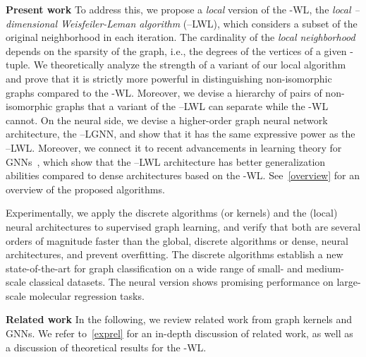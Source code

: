 \documentclass{article}
\newcommand{\xhdr}[1]{{\noindent\bfseries #1}}
\theoremstyle{definition}
\newcommand{\new}[1]{\emph{#1}}
\newcommand{\kwl}{-\textsf{WL}\xspace}
\newcommand{\localkwl}{--\textsf{LWL}\xspace}
\newcommand{\localkwln}{--\textsf{LGNN}\xspace}
\begin{document}
\xhdr{Present work} To address this, we propose a \new{local} version of the \kwl, the \new{local --dimensional Weisfeiler-Leman algorithm} (\localkwl), which considers a subset of the original neighborhood in each iteration. The cardinality of the \new{local neighborhood} depends on the sparsity of the graph, i.e., the degrees of the vertices of a given -tuple. We theoretically analyze the strength of a variant of our local algorithm and prove that it is strictly more powerful in distinguishing non-isomorphic graphs compared to the \kwl. Moreover, we devise a hierarchy of pairs of non-isomorphic graphs that a variant of the \localkwl can separate while the \kwl cannot. On the neural side, we devise a higher-order graph neural network architecture, the \localkwln, and show that it has the same expressive power as the \localkwl. Moreover, we connect it to recent advancements in learning theory for GNNs~\cite{Gar+2020}, which show that the \localkwl architecture has better generalization abilities compared to dense architectures based on the \kwl. See~\cref{overview} for an overview of the proposed algorithms.

Experimentally, we apply the discrete algorithms (or kernels) and the (local) neural architectures to supervised graph learning, and verify that both are several orders of magnitude faster than the global, discrete algorithms or dense, neural architectures, and prevent overfitting. The discrete algorithms establish a new state-of-the-art for graph classification on a wide range of small- and medium-scale classical datasets. The neural version shows promising performance on large-scale molecular regression tasks.

\xhdr{Related work}
In the following, we review related work from graph kernels and GNNs. We refer to~\cref{exprel} for an in-depth discussion of related work, as well as a discussion of theoretical results for the \kwl.
\end{document}
